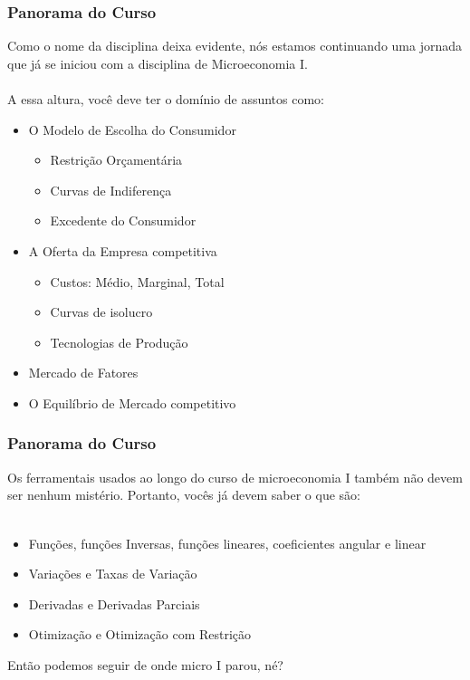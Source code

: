 \documentclass{beamer}[10]
\begin{document}
\begin{frame}
	\frametitle{Panorama do Curso}

	Como o nome da disciplina deixa evidente, nós estamos continuando uma jornada que já se iniciou com a disciplina de Microeconomia I.
	\\~\\
	A essa altura, você deve ter o domínio de assuntos como:
	\begin{itemize}
		\item O Modelo de Escolha do Consumidor
		\begin{itemize}
			\item Restrição Orçamentária
			\item Curvas de Indiferença
			\item Excedente do Consumidor
		\end{itemize}
		\item A Oferta da Empresa competitiva
		\begin{itemize}
			\item Custos: Médio, Marginal, Total
			\item Curvas de isolucro
			\item Tecnologias de Produção 
		\end{itemize}
		\item Mercado de Fatores
		\item O Equilíbrio de Mercado competitivo
	\end{itemize}
\end{frame}

\begin{frame}
	\frametitle{Panorama do Curso}
	Os ferramentais usados ao longo do curso de microeconomia I também não devem ser nenhum mistério. Portanto, vocês já devem saber o que são:
	\\~\\
	\begin{itemize}
		\item Funções, funções Inversas, funções lineares, coeficientes angular e linear
		\item Variações e Taxas de Variação
		\item Derivadas e Derivadas Parciais
		\item Otimização e Otimização com Restrição
	\end{itemize}
	Então podemos seguir de onde micro I parou, né?
\end{frame}
\end{document}
